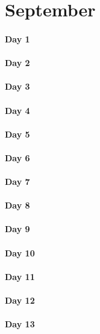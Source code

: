 \documentclass[UTF8,a4paper,8pt]{ctexart}
\begin{document}
\section{September}
 	 \paragraph{Day 1       \quad     }
 	 \paragraph{Day 2       \quad     }
 	 \paragraph{Day 3       \quad     }
 	 \paragraph{Day 4       \quad     }
 	 \paragraph{Day 5       \quad     }
 	 \paragraph{Day 6       \quad     }
 	 \paragraph{Day 7       \quad     }
 	 \paragraph{Day 8       \quad     }
 	 \paragraph{Day 9       \quad     }
 	 \paragraph{Day 10      \quad     }
 	 \paragraph{Day 11      \quad     }
 	 \paragraph{Day 12      \quad     }
 	 \paragraph{Day 13      \quad     }
\end{document}
